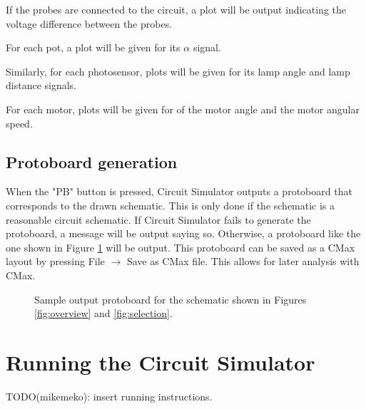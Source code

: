 \documentclass[12pt]{amsart}
\begin{document}
If the probes are connected to the circuit, a plot will be output indicating the voltage difference between the probes.

For each pot, a plot will be given for its $\alpha$ signal.

Similarly, for each photosensor, plots will be given for its lamp angle and lamp distance signals.

For each motor, plots will be given for of the motor angle and the motor angular speed.

\subsection{Protoboard generation}

When the "PB" button is pressed, Circuit Simulator outputs a protoboard that corresponds to the drawn schematic. This is only done if the schematic is a reasonable circuit schematic. If Circuit Simulator fails to generate the protoboard, a message will be output saying so. Otherwise, a protoboard like the one shown in Figure \ref{fig:protoboard} will be output. This protoboard can be saved as a CMax layout by pressing File $\rightarrow$ Save as CMax file. This allows for later analysis with CMax.

\begin{figure}
\caption{Sample output protoboard for the schematic shown in Figures \ref{fig:overview} and \ref{fig:selection}.}
\label{fig:protoboard}
\end{figure}

\section{Running the Circuit Simulator}
\label{sec:running}
TODO(mikemeko): insert running instructions.
\end{document}
